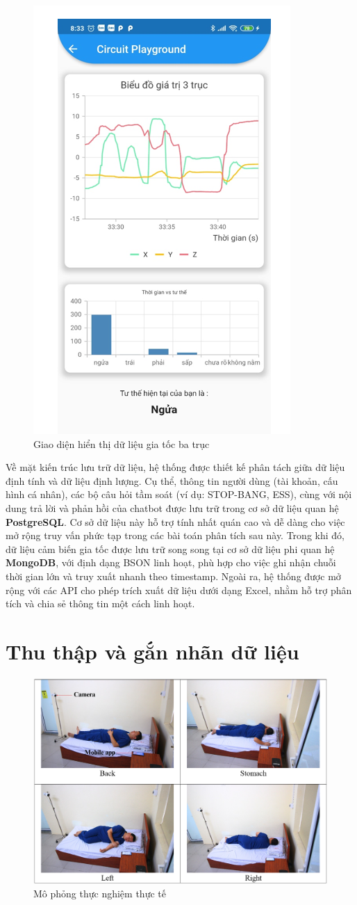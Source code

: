 \begin{figure}[htbp]
    \centering
    \includegraphics[width=0.3\linewidth]{images/appbieudo.png}
    \caption{Giao diện hiển thị dữ liệu gia tốc ba trục}
    \label{appbieudo}
\end{figure}

Về mặt kiến trúc lưu trữ dữ liệu, hệ thống được thiết kế phân tách 
giữa dữ liệu định tính và dữ liệu định lượng. Cụ thể, thông tin người 
dùng (tài khoản, cấu hình cá nhân), các bộ câu hỏi tầm soát 
(ví dụ: STOP-BANG, ESS), cùng với nội dung trả lời và phản hồi của 
chatbot được lưu trữ trong cơ sở dữ liệu quan hệ \textbf{PostgreSQL}. 
Cơ sở dữ liệu này hỗ trợ tính nhất quán cao và dễ dàng cho việc mở 
rộng truy vấn phức tạp trong các bài toán phân tích sau này.
Trong khi đó, dữ liệu cảm biến gia tốc được lưu trữ song song tại cơ 
sở dữ liệu phi quan hệ \textbf{MongoDB}, với định dạng BSON linh hoạt, 
phù hợp cho việc ghi nhận chuỗi thời gian lớn và truy xuất nhanh theo 
timestamp. Ngoài ra, hệ thống được mở rộng với các API cho phép trích 
xuất dữ liệu dưới dạng Excel, nhằm hỗ trợ phân tích và chia sẻ thông 
tin một cách linh hoạt.



\section{Thu thập và gắn nhãn dữ liệu}

\begin{figure}[htbp]
\centerline{\includegraphics[width=0.8\linewidth]{images/4position.png}}
\caption{Mô phỏng thực nghiệm thực tế}
\label{4Position}
\end{figure}

